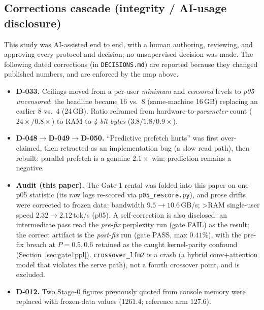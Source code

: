 \documentclass[11pt]{article}
\newcommand{\ppl}{\ensuremath{\times}}
\begin{document}
\subsection{Corrections cascade (integrity / AI-usage disclosure)}
This study was AI-assisted end to end, with a human authoring, reviewing, and approving
every protocol and decision; no unsupervised decision was made. The following dated
corrections (in \texttt{DECISIONS.md}) are reported because they changed published
numbers, and are enforced by the map above.
\begin{itemize}[leftmargin=1.6em,itemsep=1pt,topsep=2pt]
  \item \textbf{D-033.} Ceilings moved from a per-user \emph{minimum} and
        \emph{censored} levels to \emph{p05} \emph{uncensored}: the headline became
        $16$ vs.\ $8$ (same-machine 16\,GB) replacing an earlier $8$ vs.\ $4$ (24\,GB).
        Ratio reframed from hardware-to-\emph{parameter}-count ($24\ppl/0.8\ppl$) to
        RAM-to-\emph{4-bit-bytes} ($3.8/1.8/0.9\ppl$).
  \item \textbf{D-048$\rightarrow$D-049$\rightarrow$D-050.} ``Predictive prefetch hurts''
        was first over-claimed, then retracted as an implementation bug (a slow read path),
        then rebuilt: parallel prefetch is a genuine $2.1\ppl$ win; prediction remains a
        negative.
  \item \textbf{Audit (this paper).} The Gate-1 rental was folded into this paper on one
        p05 statistic (its raw logs re-scored via \texttt{p05\_rescore.py}), and prose
        drifts were corrected to frozen data: bandwidth $9.5\rightarrow10.6$\,GB/s; >RAM
        single-user speed $2.32\rightarrow2.12$\,tok/s (p05). A self-correction is also
        disclosed: an intermediate pass read the \emph{pre-fix} perplexity run (gate FAIL)
        as the result; the correct artifact is the \emph{post-fix} run (gate PASS, max
        $0.41\%$), with the pre-fix breach at $P=0.5,0.6$ retained as the caught
        kernel-parity confound (Section~\ref{sec:gate1ppl}).
        \texttt{crossover\_lfm2} is a crash (a hybrid conv+attention model that violates the
        serve path), not a fourth crossover point, and is excluded.
  \item \textbf{D-012.} Two Stage-0 figures previously quoted from console memory were
        replaced with frozen-data values ($1261.4$; reference arm $127.6$).
\end{itemize}
\end{document}
